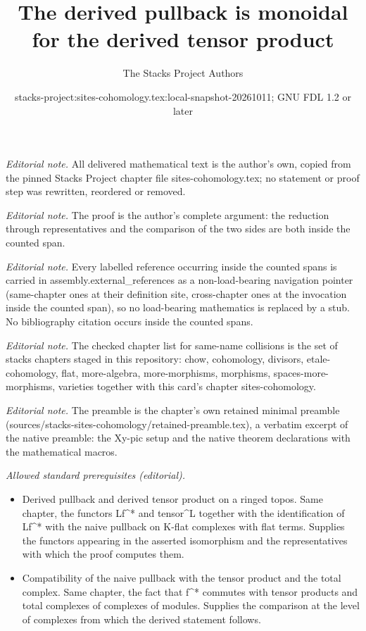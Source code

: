\documentclass[10pt,a4paper]{amsart}
\title{The derived pullback is monoidal for the derived tensor product}
\author{The Stacks Project Authors}
\date{stacks-project:sites-cohomology.tex:local-snapshot-20261011; GNU FDL 1.2 or later}
\theoremstyle{plain}
\theoremstyle{definition}
\theoremstyle{remark}
\numberwithin{equation}{subsection}
\begin{document}
\maketitle
\noindent\textit{Editorial note.} All delivered mathematical text is the author's own, copied from the pinned Stacks Project chapter file sites-cohomology.tex; no statement or proof step was rewritten, reordered or removed.\par\medskip
\noindent\textit{Editorial note.} The proof is the author's complete argument: the reduction through representatives and the comparison of the two sides are both inside the counted span.\par\medskip
\noindent\textit{Editorial note.} Every labelled reference occurring inside the counted spans is carried in assembly.external\_references as a non-load-bearing navigation pointer (same-chapter ones at their definition site, cross-chapter ones at the invocation inside the counted span), so no load-bearing mathematics is replaced by a stub. No bibliography citation occurs inside the counted spans.\par\medskip
\noindent\textit{Editorial note.} The checked chapter list for same-name collisions is the set of stacks chapters staged in this repository: chow, cohomology, divisors, etale-cohomology, flat, more-algebra, more-morphisms, morphisms, spaces-more-morphisms, varieties together with this card's chapter sites-cohomology.\par\medskip
\noindent\textit{Editorial note.} The preamble is the chapter's own retained minimal preamble (sources/stacks-sites-cohomology/retained-preamble.tex), a verbatim excerpt of the native preamble: the Xy-pic setup and the native theorem declarations with the mathematical macros.\par\medskip
\noindent\textit{Allowed standard prerequisites (editorial).}\begin{itemize}
\item Derived pullback and derived tensor product on a ringed topos. Same chapter, the functors Lf\textasciicircum{}* and tensor\textasciicircum{}L together with the identification of Lf\textasciicircum{}* with the naive pullback on K-flat complexes with flat terms. Supplies the functors appearing in the asserted isomorphism and the representatives with which the proof computes them.
\item Compatibility of the naive pullback with the tensor product and the total complex. Same chapter, the fact that f\textasciicircum{}* commutes with tensor products and total complexes of complexes of modules. Supplies the comparison at the level of complexes from which the derived statement follows.
\end{itemize}\medskip
\end{document}
